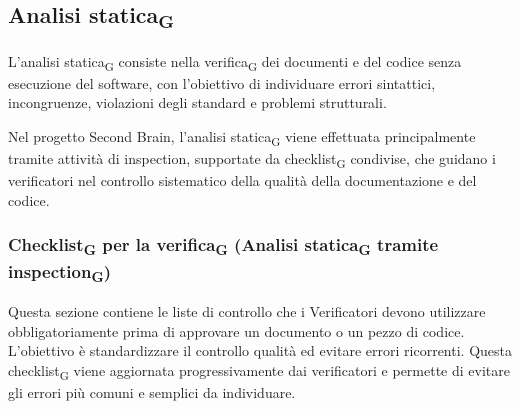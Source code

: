 \documentclass[11pt,a4paper]{article}
\newcommand{\gls}[1]{#1\textsubscript{G}}
\begin{document}
\subsection{\gls{Analisi statica}}
L’\gls{analisi statica} consiste nella \gls{verifica} dei documenti e del codice senza esecuzione del software, con l’obiettivo di individuare errori sintattici, incongruenze, violazioni degli standard e problemi strutturali.

Nel progetto Second Brain, l’\gls{analisi statica} viene effettuata principalmente tramite attività di inspection, supportate da \gls{checklist} condivise, che guidano i verificatori nel controllo sistematico della qualità della documentazione e del codice.
\subsubsection{\gls{Checklist} per la \gls{verifica} (\gls{Analisi statica} tramite inspection\textsubscript{G})}
Questa sezione contiene le liste di controllo che i Verificatori devono utilizzare obbligatoriamente prima di approvare un documento o un pezzo di codice. L'obiettivo è standardizzare il controllo qualità ed evitare errori ricorrenti.
Questa \gls{checklist} viene aggiornata progressivamente dai verificatori e permette di evitare gli errori più comuni e semplici da individuare.
\end{document}
